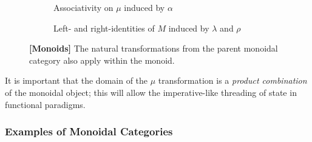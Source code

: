 \documentclass[10pt,a4paper,reqno]{amsart}
\numberwithin{figure}{section}
\begin{document}
\begin{figure}[ht]
        \begin{subfigure}{\textwidth}
                \centering
                \caption{Associativity on $\mu$ induced by $\alpha$}
        \end{subfigure}

        \begin{subfigure}{\textwidth}
                \centering
                \caption{Left- and right-identities of $M$ induced by $\lambda$
                        and $\rho$}
        \end{subfigure}%
        \caption{\textbf{[Monoids]} The natural transformations from the parent
                monoidal category also apply within the monoid.}
        \vspace{1.5em}
        \label{fig:monoid-commute}
\end{figure}

It is important that the domain of the $\mu$
transformation is a \emph{product combination} of the monoidal object; this will
allow the imperative-like threading of state in functional paradigms.

\subsubsection{Examples of Monoidal Categories}
\end{document}
